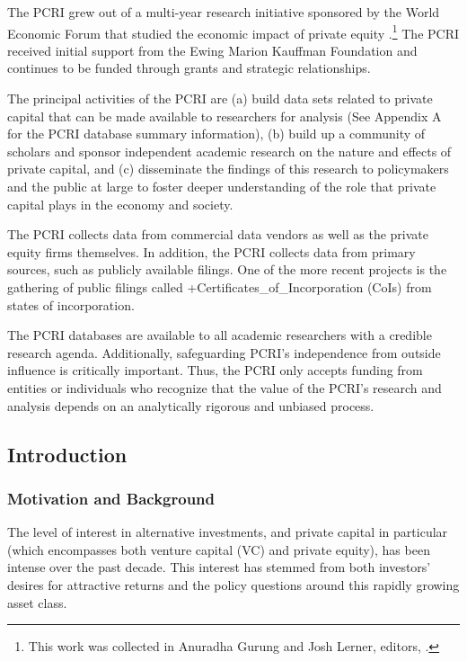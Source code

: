 \documentclass[
]{WileySix}
\begin{document}
The PCRI grew out of a multi-year research initiative sponsored by the World Economic Forum that studied the economic impact of private equity \citep{gurung2008}.\footnote{This work was collected in Anuradha Gurung and Josh Lerner, editors, \citep{gurung2008}.} The PCRI received initial support from the Ewing Marion Kauffman Foundation and continues to be funded through grants and strategic relationships.

The principal activities of the PCRI are (a) build data sets related to private capital that can be made available to researchers for analysis (See Appendix A for the PCRI database summary information), (b) build up a community of scholars and sponsor independent academic research on the nature and effects of private capital, and (c) disseminate the findings of this research to policymakers and the public at large to foster deeper understanding of the role that private capital plays in the economy and society.

The PCRI collects data from commercial data vendors as well as the private equity firms themselves. In addition, the PCRI collects data from primary sources, such as publicly available filings. One of the more recent projects is the gathering of public filings called +Certificates\_of\_Incorporation\textbar{} (CoIs) from states of incorporation.

The PCRI databases are available to all academic researchers with a credible research agenda. Additionally, safeguarding PCRI's independence from outside influence is critically important. Thus, the PCRI only accepts funding from entities or individuals who recognize that the value of the PCRI's research and analysis depends on an analytically rigorous and unbiased process.

\hypertarget{introduction-4}{%
\subsection{Introduction}\label{introduction-4}}

\hypertarget{motivation-and-background-3}{%
\subsubsection{Motivation and Background}\label{motivation-and-background-3}}

The level of interest in alternative investments, and private capital in particular (which encompasses both venture capital (VC) and private equity), has been intense over the past decade. This interest has stemmed from both investors' desires for attractive returns and the policy questions around this rapidly growing asset class.
\end{document}

